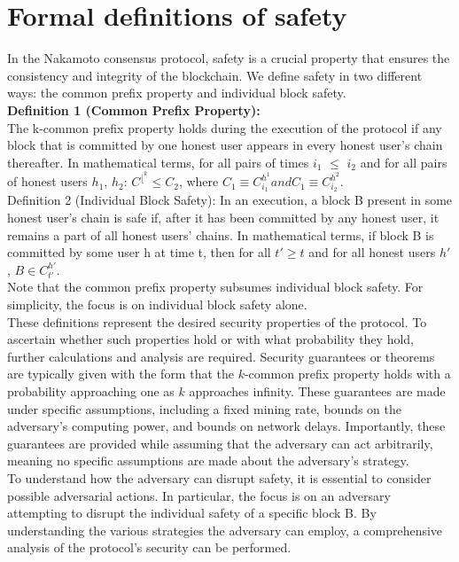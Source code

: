 \section{Formal definitions of safety}
In the Nakamoto consensus protocol, safety is a crucial property that ensures the consistency and integrity of the blockchain. We define safety in two different ways: the common prefix property and individual block safety.\\
\textbf{Definition 1 (Common Prefix Property):}\\
The k-common prefix property holds during the execution of the protocol if any block that is committed by one honest user appears in every honest user's chain thereafter. In mathematical terms, for all pairs of times $i_{1}$ $\leq$ $i_{2}$ and for all pairs of honest users $h_{1}$, $h_{2}$:
$C^{⌊^{k}} \leq C_{2}$,
where $C_{1} \equiv	 C_{i_{1}}^{h^{1}} and C_{1} \equiv C_{i_{2}}^{h^{2}}.$\\
Definition 2 (Individual Block Safety):
In an execution, a block B present in some honest user's chain is safe if, after it has been committed by any honest user, it remains a part of all honest users' chains. In mathematical terms, if block B is committed by some user h at time t, then for all $t′ \geq t$ and for all honest users $h′$, $B \in C_{t'}^{h′}$.\\
Note that the common prefix property subsumes individual block safety. For simplicity, the focus is on individual block safety alone.\\
These definitions represent the desired security properties of the protocol. To ascertain whether such properties hold or with what probability they hold, further calculations and analysis are required. Security guarantees or theorems are typically given with the form that the $k$-common prefix property holds with a probability approaching one as $k$ approaches infinity. These guarantees are made under specific assumptions, including a fixed mining rate, bounds on the adversary's computing power, and bounds on network delays. Importantly, these guarantees are provided while assuming that the adversary can act arbitrarily, meaning no specific assumptions are made about the adversary's strategy.\\
To understand how the adversary can disrupt safety, it is essential to consider possible adversarial actions. In particular, the focus is on an adversary attempting to disrupt the individual safety of a specific block B. By understanding the various strategies the adversary can employ, a comprehensive analysis of the protocol's security can be performed.
